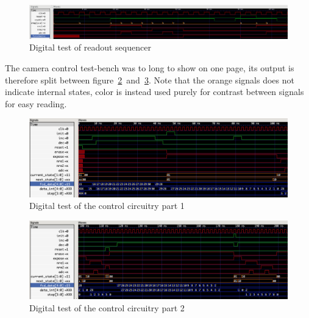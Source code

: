 \begin{figure}[H]
  \centering
  \includegraphics[width=\textwidth]{figures/readoutTest}
  \caption{Digital test of readout sequencer}
  \label{fig:digreadouttest}
\end{figure}


The camera control test-bench was to long to show on one page, its output is therefore split between figure~\ref{fig:digcamtest1}~and~\ref{fig:digcamtest2}.
Note that the orange signals does not indicate internal states, color is instead used purely for contrast between signals for easy reading.

\begin{figure}[H]
  \centering
  \includegraphics[width=\textwidth]{figures/cameraTest1}
  \caption{Digital test of the control circuitry part 1}
  \label{fig:digcamtest1}
\end{figure}

\begin{figure}[H]
  \centering
  \includegraphics[width=\textwidth]{figures/cameraTest2}
  \caption{Digital test of the control circuitry part 2}
  \label{fig:digcamtest2}
\end{figure}